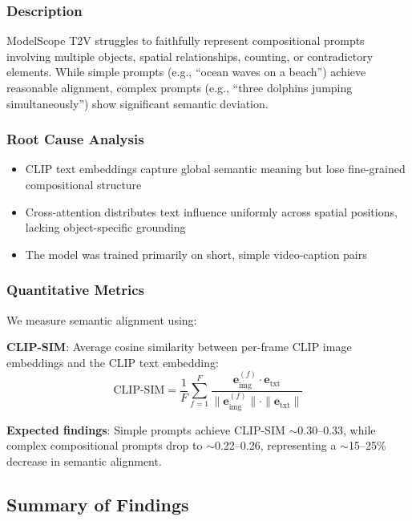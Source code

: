 \documentclass[conference]{IEEEtran}
\begin{document}
\subsubsection{Description}
ModelScope T2V struggles to faithfully represent compositional prompts involving multiple objects, spatial relationships, counting, or contradictory elements. While simple prompts (e.g., ``ocean waves on a beach'') achieve reasonable alignment, complex prompts (e.g., ``three dolphins jumping simultaneously'') show significant semantic deviation.

\subsubsection{Root Cause Analysis}
\begin{itemize}
    \item CLIP text embeddings capture global semantic meaning but lose fine-grained compositional structure
    \item Cross-attention distributes text influence uniformly across spatial positions, lacking object-specific grounding
    \item The model was trained primarily on short, simple video-caption pairs
\end{itemize}

\subsubsection{Quantitative Metrics}
We measure semantic alignment using:

\textbf{CLIP-SIM}: Average cosine similarity between per-frame CLIP image embeddings and the CLIP text embedding:
\begin{equation}
    \text{CLIP-SIM} = \frac{1}{F} \sum_{f=1}^{F} \frac{\mathbf{e}_{\text{img}}^{(f)} \cdot \mathbf{e}_{\text{txt}}}{\|\mathbf{e}_{\text{img}}^{(f)}\| \cdot \|\mathbf{e}_{\text{txt}}\|}
\end{equation}

\textbf{Expected findings}: Simple prompts achieve CLIP-SIM $\sim$0.30--0.33, while complex compositional prompts drop to $\sim$0.22--0.26, representing a $\sim$15--25\% decrease in semantic alignment.

\subsection{Summary of Findings}
\end{document}
